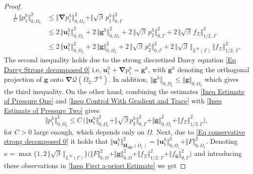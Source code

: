 \documentclass[3p]{elsarticle}
\def\g{\mathbf g}
\def\ph{p^{h}}
\def\grad{\bm{\nabla}}
\def\uoneh{\mathbf{u}_{1}^{h}}
\def\Hdiv{\mathbf{H_{div}}}
\def\poneh{p_{1}^{h}}
\def\ptwoh{p_{2}^{h}}
\def\flux{f_{\bm{\hat{n}} } }
\def\stress{f_{\Sigma } }
\def\triang{\mathcal{T}}
\def\Omeone{\Omega_{1}}
\begin{document}
\begin{proof}
%
\begin{equation}\label{Ineq Estimate of Pressure Two}
%
\begin{split} %
\frac{1}{C} \, \Vert \poneh \Vert_{0, \Omega_{1}}^{2} 
& \leq 
\Vert \grad \poneh \Vert_{0, \Omega_{1}}^{2}
+ \Vert \sqrt{\beta} \, \poneh\Vert_{0, \Gamma}^{2} \\
%
& \leq
2 \, \Vert \uoneh \Vert_{0, \Omega_{1}}^{2} 
+ 2 \, \Vert \g^{h}\Vert_{0, \Omega_{1}}^{2} 
+ 2 \, \Vert \sqrt{\beta} \, \ph_{2}\Vert_{0, \Gamma}^{2}
+ 2 \, \Vert \sqrt{\beta} \, \stress \Vert_{1/2, \, \Gamma}^{2} \\
%
& \leq
2 \, \Vert \uoneh \Vert_{0, \Omega_{1}}^{2} 
+ 2 \, \Vert \g\Vert_{0, \Omega_{1}}^{2} 
+ 2 \, \Vert \sqrt{\beta} \, \ph_{2}\Vert_{0, \Gamma}^{2}
+ 2 \, \big\Vert \sqrt{\beta} \, \big\Vert_{L^{\infty}(\Gamma)} \, \Vert  \stress \Vert_{1/2, \, \Gamma}^{2} . %
\end{split}
% 
\end{equation}
%
The second inequality holds due to the strong discretized Darcy equation \eqref{Eq Darcy Strong decomposed 0} i.e, $\uoneh + \grad \poneh = \g^{h}$, with $\g^{h}$ denoting the orthogonal projection of $\g$ onto $\grad \mathcal{Q}(\Omega_{2}, \triang^{h})$. In addition, $\Vert \g^{h} \Vert_{0, \Omega_{1}} \leq \Vert \g \Vert_{0, \Omega_{1}}$ which gives the third inequality. On the other hand, combining the estimates \eqref{Ineq Estimate of Pressure One} and \eqref{Ineq Control With Gradient and Trace} with \eqref{Ineq Estimate of Pressure Two} gives
%
   \begin{equation}\label{Ineq Second Estimate of Pressure One}
      \Vert \poneh\Vert_{0, \Omega_{1}}^{2}
      \leq C\, \big(\Vert \uoneh \Vert_{0, \Omega_{1}}^{2}
      + \Vert \sqrt{\beta} \, \ptwoh \Vert_{0, \Gamma}^{2}
      + \Vert \g \Vert_{0, \Omega_{1} }^{2}
      + \Vert \stress \Vert_{1/2, \Gamma}^{2}
      \big) ,
   \end{equation}
%
for $C  > 0$ large enough, which depends only on $\Omega$. Next, 
due to \eqref{Eq conservative strong decomposed 0} it holds that $\Vert \uoneh\Vert_{\Hdiv(\Omeone)}^{2} 
= 
\Vert \uoneh \Vert_{0, \Omeone}^{2} 
+ \Vert F\Vert_{0,\Omeone}^{2}$. Denoting 
$\kappa = \max \big\{1, 2 \, \big\Vert \sqrt{\beta} \, \big\Vert_{L^{\infty}(\Gamma)}  \big\}
\big(\Vert F\Vert_{0, \Omega}^{2}
+ \Vert \g\Vert_{0, \Omega}^{2}
+ \Vert \stress \Vert_{1/2,\,\Gamma}^{2}
+ \Vert \flux \Vert_{0, \Gamma}^{2}\big)$ and introducing these observations in \eqref{Ineq First a-priori Estimate} we get

\end{proof}
\end{document}
